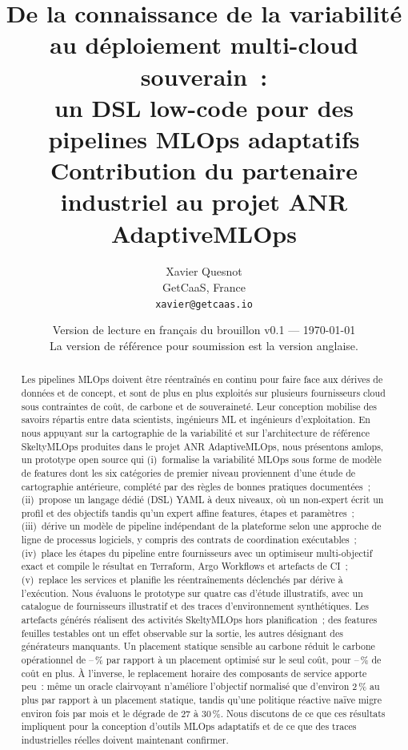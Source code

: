 \documentclass[10pt,a4paper]{article}
\title{De la connaissance de la variabilité au déploiement multi-cloud souverain~:\\
un DSL low-code pour des pipelines MLOps adaptatifs\\[4pt]
\large Contribution du partenaire industriel au projet ANR AdaptiveMLOps}
\author{Xavier Quesnot\\ GetCaaS, France\\ \texttt{xavier@getcaas.io}}
\date{Version de lecture en français du brouillon v0.1 --- \today\\
\small La version de référence pour soumission est la version anglaise.}
\newcommand{\tool}{\textsf{amlops}}
\begin{document}
\maketitle

\begin{abstract}
Les pipelines MLOps doivent être réentraînés en continu pour faire face aux dérives
de données et de concept, et sont de plus en plus exploités sur plusieurs
fournisseurs cloud sous contraintes de coût, de carbone et de souveraineté. Leur
conception mobilise des savoirs répartis entre data scientists, ingénieurs ML et
ingénieurs d'exploitation. En nous appuyant sur la cartographie de la variabilité et
sur l'architecture de référence SkeltyMLOps produites dans le projet ANR
AdaptiveMLOps, nous présentons \tool, un prototype open source qui
(i)~formalise la variabilité MLOps sous forme de modèle de features dont les six
catégories de premier niveau proviennent d'une étude de cartographie antérieure,
complété par des règles de bonnes pratiques documentées~; (ii)~propose un langage
dédié (DSL) YAML à deux niveaux, où un non-expert écrit un profil et des objectifs
tandis qu'un expert affine features, étapes et paramètres~; (iii)~dérive un modèle
de pipeline indépendant de la plateforme selon une approche de ligne de processus
logiciels, y compris des contrats de coordination exécutables~; (iv)~place les
étapes du pipeline entre fournisseurs avec un optimiseur multi-objectif exact et
compile le résultat en Terraform, Argo Workflows et artefacts de CI~; (v)~replace
les services et planifie les réentraînements déclenchés par dérive à l'exécution.
Nous évaluons le prototype sur quatre cas d'étude illustratifs, avec un catalogue
de fournisseurs illustratif et des traces d'environnement synthétiques. Les
artefacts générés réalisent \CovNonPlan{} des activités SkeltyMLOps hors
planification~; \FeatEffective{} des \FeatTested{} features feuilles testables ont un
effet observable sur la sortie, les autres désignant des générateurs manquants. Un
placement statique sensible au carbone réduit le carbone opérationnel de
\CarbonSavingChurn--\CarbonSavingRetail\,\% par rapport à un placement optimisé sur
le seul coût, pour \CostExtraChurn--\CostExtraRetail\,\% de coût en plus. À
l'inverse, le replacement horaire des composants de service apporte peu~: même un
oracle clairvoyant n'améliore l'objectif normalisé que d'environ 2\,\% au plus par
rapport à un placement statique, tandis qu'une politique réactive naïve migre environ
\MigAReactive{} fois par mois et le dégrade de 27 à 30\,\%. Nous discutons de ce que
ces résultats impliquent pour la conception d'outils MLOps adaptatifs et de ce que
des traces industrielles réelles doivent maintenant confirmer.
\end{abstract}
\end{document}

